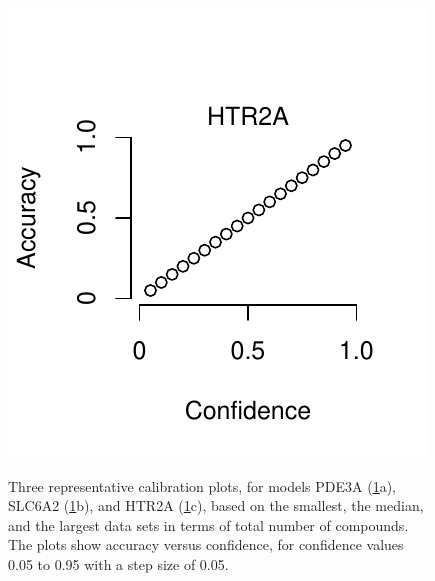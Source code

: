\documentclass[utf8]{frontiersSCNS} %
\begin{document}
\begin{figure}[h!]
\begin{minipage}[c]{0.3\textwidth}
        \label{fig:calplots:b}
        \subcaption{}
    \end{minipage}
    \begin{minipage}[c]{0.3\textwidth}
        \includegraphics[width=\textwidth]{figures/calibration_plots/htr2a_calib.pdf}
        \label{fig:calplots:c}
        \subcaption{}
    \end{minipage}
    \caption{Three representative calibration plots, for models PDE3A (\ref{fig:calplots}a), SLC6A2  (\ref{fig:calplots}b),
    and HTR2A (\ref{fig:calplots}c), based on the smallest, the median, and the largest data sets in
    terms of total number of compounds. The plots show accuracy versus
    confidence, for confidence values 0.05 to 0.95 with a step size of 0.05.}
    \label{fig:calplots}
\end{figure}

\end{document}
